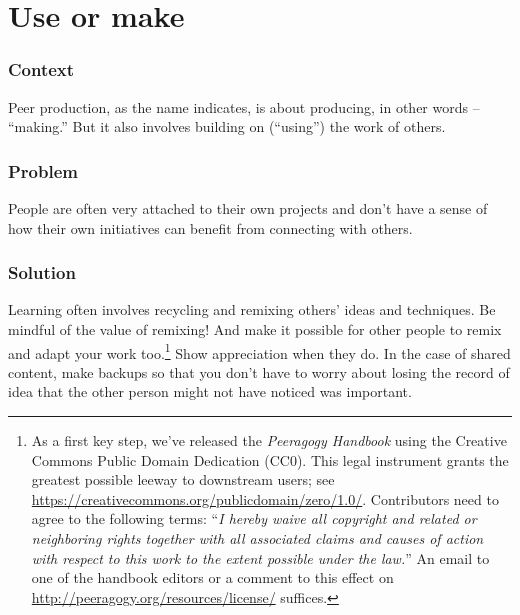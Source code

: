 \section{Use or make}\label{sec:Use_or_make}
\subsubsection*{Context}
Peer production, as the name indicates, is about producing, in other words --
``making.'' But it also involves building on (``using'') the work of others.

\subsubsection*{Problem}
People are often very attached to their own projects and don't have a sense of how their own initiatives can benefit from connecting with others.

\subsubsection*{Solution} Learning often involves recycling and remixing others' ideas and techniques. Be mindful of the value of remixing!  And make it possible for other people to remix and adapt your work too.\footnote{As a first key step, we've released the \emph{Peeragogy Handbook} using the Creative Commons Public Domain Dedication (CC0).  This legal instrument grants the greatest possible leeway to downstream users; see \url{https://creativecommons.org/publicdomain/zero/1.0/}.  Contributors need to agree to the following terms: ``\emph{I hereby waive all copyright and related or neighboring rights together with all associated claims and causes of action with respect to this work to the extent possible under the law.}''  An email to one of the handbook editors or a comment to this effect on \url{http://peeragogy.org/resources/license/} suffices.}  Show appreciation when they do.  In the case of shared content, make backups so that you don't have to worry about losing the record of idea that the other person might not have noticed was important.

